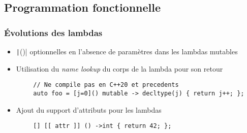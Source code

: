 \documentclass[C++.tex]{subfiles}
\begin{document}
\subsection*{Programmation fonctionnelle}
\begin{frame}[fragile]
	\frametitle{Évolutions des lambdas}
	\begin{itemize}
		\item \texttt|()| optionnelles en l'absence de paramètres dans les lambdas mutables


		\item Utilisation du \textit{name lookup} du corps de la lambda pour son retour
	\end{itemize}

	\begin{verbatim}
		// Ne compile pas en C++20 et precedents
		auto foo = [j=0]() mutable -> decltype(j) { return j++; };
	\end{verbatim}


	\begin{itemize}
		\item Ajout du support d'attributs pour les lambdas
	\end{itemize}

	\begin{verbatim}
		[] [[ attr ]] () ->int { return 42; };
	\end{verbatim}


\end{frame}
\end{document}
